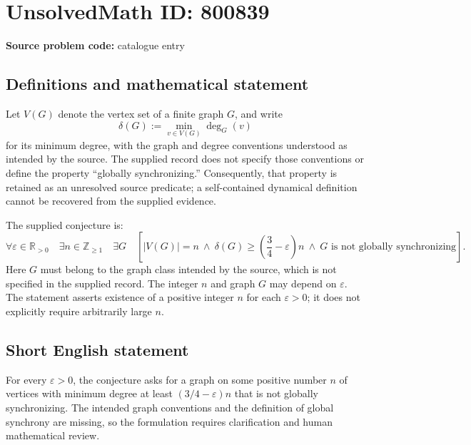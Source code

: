 \documentclass[11pt]{article}
\newcommand{\Z}{\mathbb{Z}}
\newcommand{\R}{\mathbb{R}}
\begin{document}
\section*{UnsolvedMath ID: 800839}
\textbf{Source problem code:} catalogue entry
\subsection{Definitions and mathematical statement}
Let \(V(G)\) denote the vertex set of a finite graph \(G\), and write
\[
\delta(G):=\min_{v\in V(G)}\deg_G(v)
\]
for its minimum degree, with the graph and degree conventions understood as intended by the source. The supplied record does not specify those conventions or define the property ``globally synchronizing.'' Consequently, that property is retained as an unresolved source predicate; a self-contained dynamical definition cannot be recovered from the supplied evidence.

The supplied conjecture is:
\[
\forall\varepsilon\in\R_{>0}\quad
\exists n\in\Z_{\geq 1}\quad
\exists G\quad
\left[
|V(G)|=n\ \land\
\delta(G)\geq\left(\frac34-\varepsilon\right)n
\ \land\
G\text{ is not globally synchronizing}
\right].
\]
Here \(G\) must belong to the graph class intended by the source, which is not specified in the supplied record. The integer \(n\) and graph \(G\) may depend on \(\varepsilon\). The statement asserts existence of a positive integer \(n\) for each \(\varepsilon>0\); it does not explicitly require arbitrarily large \(n\).
\subsection{Short English statement}
For every \(\varepsilon>0\), the conjecture asks for a graph on some positive number \(n\) of vertices with minimum degree at least \((3/4-\varepsilon)n\) that is not globally synchronizing. The intended graph conventions and the definition of global synchrony are missing, so the formulation requires clarification and human mathematical review.
\end{document}
